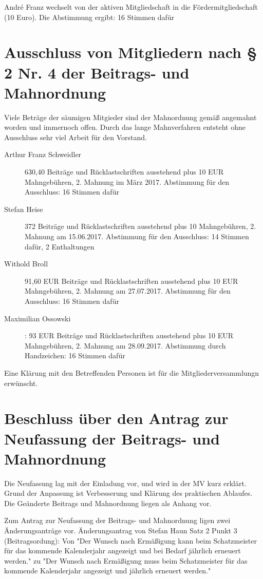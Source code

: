 \documentclass[a4paper,12pt,titlepage]{scrartcl}
\begin{document}
André Franz wechselt von der aktiven Mitgliedschaft in die Fördermitgliedschaft (10 Euro). Die Abstimmung ergibt: 16 Stimmen dafür

\section{ Ausschluss von Mitgliedern nach § 2 Nr. 4 der Beitrags- und Mahnordnung }

Viele Beträge der säumigen Mitgieder sind der Mahnordnung gemäß angemahnt worden und immernoch offen. Durch das lange Mahnverfahren entsteht ohne Ausschluss sehr viel Arbeit für den Vorstand.

\begin{description}

\item[Arthur Franz Schweidler] 630,40 \EUR Beiträge und Rücklastschriften ausstehend plus 10 EUR Mahngebühren, 2. Mahnung im März 2017. Abstimmung für den Ausschluss: 16 Stimmen dafür
\item[Stefan Heise] 372 \EUR Beiträge und Rücklastschriften ausstehend plus 10 \EUR Mahngebühren, 2. Mahnung am 15.06.2017. Abstimmung für den Ausschluss: 14 Stimmen dafür, 2 Enthaltungen
\item[Withold Broll] 91,60 EUR Beiträge und Rücklastschriften ausstehend plus 10 EUR Mahngebühren, 2. Mahnung am 27.07.2017. Abstimmung für den Ausschluss: 16 Stimmen dafür
\item[Maximilian Ossowski]: 93 EUR Beiträge und Rücklastschriften ausstehend plus 10 EUR Mahngebühren, 2. Mahnung am 28.09.2017. Abstimmung durch Handzeichen: 16 Stimmen dafür
\end{description}

Eine Klärung mit den Betreffenden Personen ist für die Mitgliederversammlungn erwünscht.


\section{Beschluss über den Antrag zur Neufassung der Beitrags- und Mahnordnung}

Die Neufassung lag mit der Einladung vor, und wird in der MV kurz erklärt. Grund der Anpassung ist Verbesserung und Klärung des praktischen Ablaufes. Die Geänderte Beitrags und Mahnordnung liegen als Anhang vor.
 
Zum Antrag zur Neufassung der Beitrags- und Mahnordnung ligen zwei Änderungsanträge vor.
Änderungsantrag von Stefan Haun Satz 2 Punkt 3 (Beitragsordung): Von 
"Der Wunsch nach Ermäßigung kann beim Schatzmeister für das
kommende Kalenderjahr angezeigt und bei Bedarf jährlich erneuert werden." zu 
"Der Wunsch nach Ermäßigung muss beim Schatzmeister für das
kommende Kalenderjahr angezeigt und jährlich erneuert werden."
\end{document}
